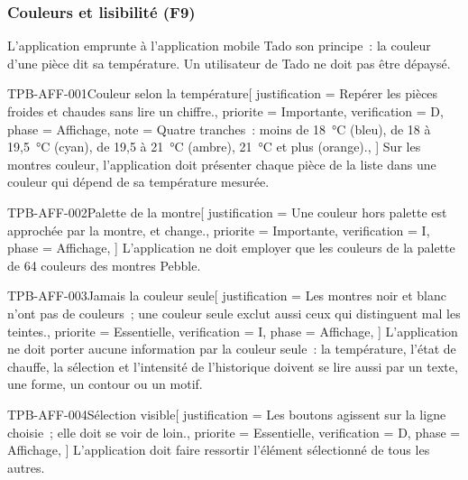 \subsubsection{Couleurs et lisibilité (F9)}
\label{sec:affichage}

L'application emprunte à l'application mobile Tado son principe~: la couleur d'une pièce dit
sa température. Un utilisateur de Tado ne doit pas être dépaysé.

\begin{exigence}{TPB-AFF-001}{Couleur selon la température}[
    justification = {Repérer les pièces froides et chaudes sans lire un chiffre.},
    priorite      = {Importante},
    verification  = {D},
    phase         = {Affichage},
    note          = {Quatre tranches~: moins de 18~°C (bleu), de 18 à 19,5~°C (cyan), de
                     19,5 à 21~°C (ambre), 21~°C et plus (orange).},
  ]
  Sur les montres couleur, l'application doit présenter chaque pièce de la liste dans une
  couleur qui dépend de sa température mesurée.
\end{exigence}

\begin{exigence}{TPB-AFF-002}{Palette de la montre}[
    justification = {Une couleur hors palette est approchée par la montre, et change.},
    priorite      = {Importante},
    verification  = {I},
    phase         = {Affichage},
  ]
  L'application ne doit employer que les couleurs de la palette de 64 couleurs des montres
  Pebble.
\end{exigence}

\begin{exigence}{TPB-AFF-003}{Jamais la couleur seule}[
    justification = {Les montres noir et blanc n'ont pas de couleurs~; une couleur seule
                     exclut aussi ceux qui distinguent mal les teintes.},
    priorite      = {Essentielle},
    verification  = {I},
    phase         = {Affichage},
  ]
  L'application ne doit porter aucune information par la couleur seule~: la température,
  l'état de chauffe, la sélection et l'intensité de l'historique doivent se lire aussi par
  un texte, une forme, un contour ou un motif.
\end{exigence}

\begin{exigence}{TPB-AFF-004}{Sélection visible}[
    justification = {Les boutons agissent sur la ligne choisie~; elle doit se voir de loin.},
    priorite      = {Essentielle},
    verification  = {D},
    phase         = {Affichage},
  ]
  L'application doit faire ressortir l'élément sélectionné de tous les autres.
\end{exigence}

